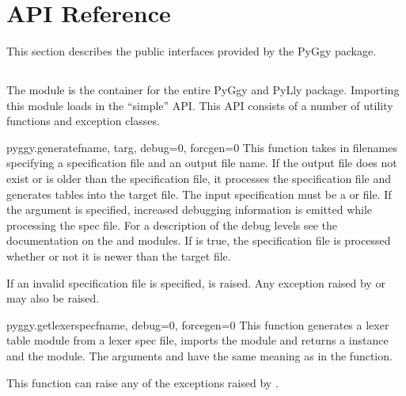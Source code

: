 \chapter{API Reference}

This section describes the public interfaces provided by
the PyGgy package.

\section{}

The  module is the container for the entire PyGgy
and PyLly package.  Importing this module loads in the ``simple''
API.   This API consists of a number of utility functions and
exception classes.

\begin{funcdesc}{pyggy.generate}{fname, targ, debug=0, forcgen=0}
This function takes in filenames specifying a specification file
and an output file name.  If the output file does not exist or
is older than the specification file, it processes the specification
file and generates tables into the target file.  The input specification
must be a  or  file.  If the  argument
is specified, increased debugging information is emitted while
processing the spec file.  For
a description of the debug levels see the documentation on the
 and  modules.  If 
is true, the specification file is processed whether or not it is
newer than the target file.

If an invalid specification file is specified, 
is raised.  Any exception raised by  or
 may also be raised.
\end{funcdesc}

\begin{funcdesc}{pyggy.getlexer}{specfname, debug=0, forcegen=0}
This function generates a lexer table module from a lexer spec file, imports
the module and returns a  instance and the
module.  The arguments  and  have the
same meaning as in the  function.

This function can raise any of the exceptions raised by .
\end{funcdesc}

